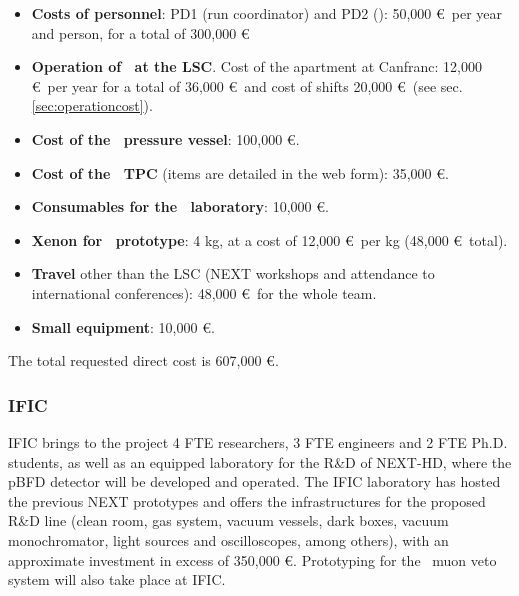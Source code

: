 \begin{itemize}[noitemsep,topsep=0pt,parsep=0pt,partopsep=0pt]
\item {\bf Costs of personnel}: PD1 (run coordinator) and PD2 (\HDEMO):  50,000 \euro\ per year and person, for a total of 300,000 \euro\ \item {\bf Operation of \Next\ at the LSC}. Cost of the apartment at Canfranc: 12,000 \euro\ per year for a total of 36,000 \euro\ and cost of shifts 20,000 \euro\ (see sec.\ref{sec:operationcost}). 
\item {\bf Cost of the \HDEMO\ pressure vessel}: 100,000 \euro.
\item {\bf Cost of the \HDEMO\ TPC} (items are detailed in the web form):  35,000 \euro.
\item {\bf Consumables for the \HDEMO\ laboratory}: 10,000 \euro.
\item {\bf Xenon for \HDEMO\ prototype}: 4 kg, at a cost of  12,000 \euro\ per kg (48,000 \euro\ total). 
\item {\bf Travel} other than the LSC (NEXT workshops and attendance to international conferences): 48,000 \euro\ for the whole team. 
\item {\bf Small equipment}: 10,000 \euro.
\end{itemize}

The total requested direct cost is 607,000 \euro. 

\subsubsection{IFIC}

IFIC brings to the project 4 FTE researchers, 3 FTE engineers and 2 FTE Ph.D. students, as well as an equipped laboratory for the R\&D of NEXT-HD, where the pBFD detector will be developed and operated. The IFIC laboratory has hosted the previous NEXT prototypes and offers the infrastructures for the proposed R\&D line (clean room, gas system, vacuum vessels, dark boxes, vacuum monochromator, light sources and oscilloscopes, among others), with an approximate investment in excess of 350,000 \euro. Prototyping for the \Next\ muon veto system will also take place at IFIC.


